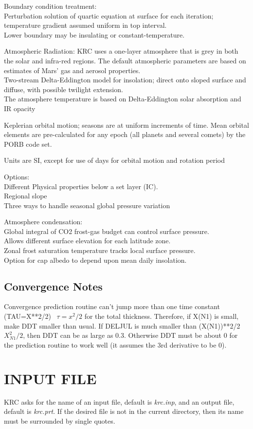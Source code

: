 \documentclass[draft]{article}  %
\newcommand{\qi}{\\ \hspace*{2.em}}      %
\newcommand{\qii}{\\ \hspace*{4.em}}     %
\newcommand{\nf}{\textit}  %
\begin{document}
Boundary condition treatment:
\qi  Perturbation solution of quartic equation at surface for each iteration;
    temperature gradient assumed uniform in top interval.
\qi  Lower boundary may be insulating or constant-temperature.

Atmospheric Radiation: KRC uses a one-layer atmosphere that is grey in both the
solar and infra-red regions. The default atmospheric
parameters are based on estimates of Mars' gas and aerosol properties.
\qi  Two-stream Delta-Eddington model for insolation; direct onto sloped surface and diffuse, with possible twilight extension.
\\ The atmosphere temperature is based on Delta-Eddington solar absorption and IR opacity

Keplerian orbital motion; seasons are at uniform increments of time. Mean 
orbital elements are pre-calculated for any epoch (all planets and several
comets) by the PORB code set.

Units are SI, except for use of days for orbital motion and rotation period 

Options:
\qi  Different Physical properties below a set layer (IC).
\qi  Regional slope
\qi  Three ways to handle seasonal global pressure variation

Atmosphere condensation: 
\qi Global integral of CO2 frost-gas budget can control surface pressure.
\qi Allows different surface elevation for each latitude zone.
\qii  Zonal frost saturation temperature tracks local surface pressure.
\qi Option for cap albedo to depend upon mean daily insolation.

\subsection{Convergence Notes} %

Convergence prediction routine can't jump more than one time constant
(TAU=X**2/2) \ $\tau =x^2/2$ for the total thickness.  Therefore, if X(N1) is
small, make DDT smaller than usual.  If DELJUL is much smaller than (X(N1))**2/2
\ $X_{N1}^2/2$, then DDT can be as large as 0.3.  Otherwise DDT must be about 0
for the prediction routine to work well (it assumes the 3rd derivative to be 0).

\section{INPUT FILE}

KRC asks for the name of an input file, default is \nf{krc.inp}, and an output
file, default is \nf{krc.prt}. If the desired file is not in the current
directory, then its name must be surrounded by single quotes.
\end{document}
